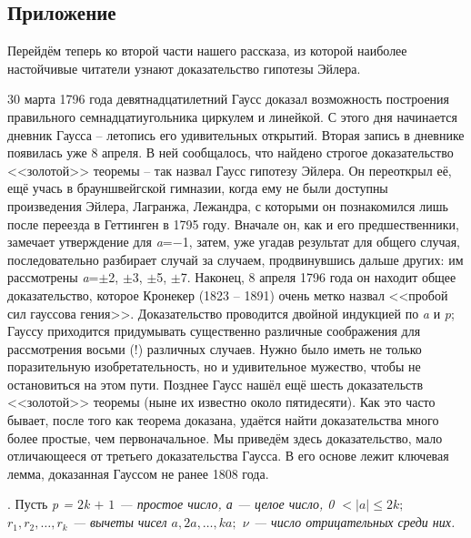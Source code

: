 \newpage
\sodef\so{}{.3em}{.75em}{.55em}
\pagecolor[cmyk]{0,0,0.13,0}
\setcounter{page}{6}
\pagestyle{fancy}
\fancyhf{}
\fancyfoot[L]{\thepage}
\begin{minipage}[t]{0.4\textwidth}
\setlength{\parindent}{4ex}
\subsection*{Приложение}
\hspace{4ex}Перейдём теперь ко второй части нашего рассказа, из которой наиболее настойчивые читатели узнают доказательство гипотезы Эйлера.
\par
30 марта 1796 года девятнадцатилетний Гаусс доказал возможность построения правильного семнадцатиугольника циркулем и линейкой. С этого дня начинается дневник Гаусса -- летопись его удивительных открытий. Вторая запись в дневнике появилась уже 8 апреля. В ней сообщалось, что найдено строгое доказательство <<золотой>> теоремы -- так назвал Гаусс гипотезу Эйлера. Он переоткрыл её, ещё учась в брауншвейгской гимназии, когда ему не были доступны произведения Эйлера, Лагранжа, Лежандра, с которыми он познакомился лишь после переезда в Геттинген в 1795 году. Вначале он, как и его предшественники, замечает утверждение для \textit{a}=$-$1, затем, уже угадав результат для общего случая, последовательно разбирает случай за случаем, продвинувшись дальше других: им рассмотрены \textit{a}=$\pm$2, $\pm$3, $\pm$5, $\pm$7. Наконец, 8 апреля 1796 года он находит общее доказательство, которое Кронекер (1823 -- 1891) очень метко назвал <<пробой сил гауссова гения>>. Доказательство проводится двойной индукцией по \textit{a} и \textit{p}; Гауссу приходится придумывать существенно различные соображения для рассмотрения восьми (!) различных случаев. Нужно было иметь не только поразительную изобретательность, но и удивительное мужество, чтобы не остановиться на этом пути. Позднее Гаусс нашёл ещё шесть доказательств <<золотой>> теоремы (ныне их известно около пятидесяти). Как это часто бывает, после того как теорема доказана, удаётся найти доказательства много более простые, чем первоначальное. Мы приведём здесь доказательство, мало отличающееся от третьего доказательства Гаусса. В его основе лежит ключевая лемма, доказанная Гауссом не ранее 1808 года.
\\
\par
\large{. Пусть \textit{p = $2$k $+$ $1$ --- простое число, а --- целое число, 0 $< |a| \leq 2k;$ $r_1, r_2, \ldots, r_k$ --- вычеты чисел $a, 2a, \ldots, ka;$ $\nu$ --- число отрицательных среди них.}}
\end{minipage}
